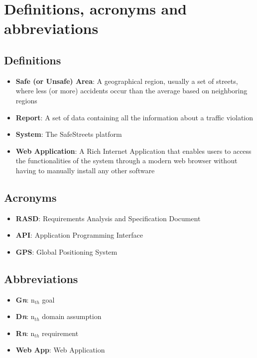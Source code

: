 \section{Definitions, acronyms and abbreviations}

\subsection{Definitions}
\begin{itemize}
  \item \textbf{Safe (or Unsafe) Area}: A geographical region, usually a set of streets, where less (or more) accidents occur than the average based on neighboring regions
  \item \textbf{Report}: A set of data containing all the information about a traffic violation
  \item \textbf{System}: The SafeStreets platform
  \item \textbf{Web Application}: A Rich Internet Application that enables users to access the functionalities of the system through a modern web browser without having to manually install any other software
\end{itemize}

\subsection{Acronyms}
\begin{itemize}
  \item \textbf{RASD}: Requirements Analysis and Specification Document
  \item \textbf{API}: Application Programming Interface
  \item \textbf{GPS}: Global Positioning System
\end{itemize}

\subsection{Abbreviations}
\begin{itemize}
  \item \textbf{G\textit{n}}: n$_{th}$ goal
  \item \textbf{D\textit{n}}: n$_{th}$ domain assumption
  \item \textbf{R\textit{n}}: n$_{th}$ requirement
  \item \textbf{Web App}: Web Application
\end{itemize}